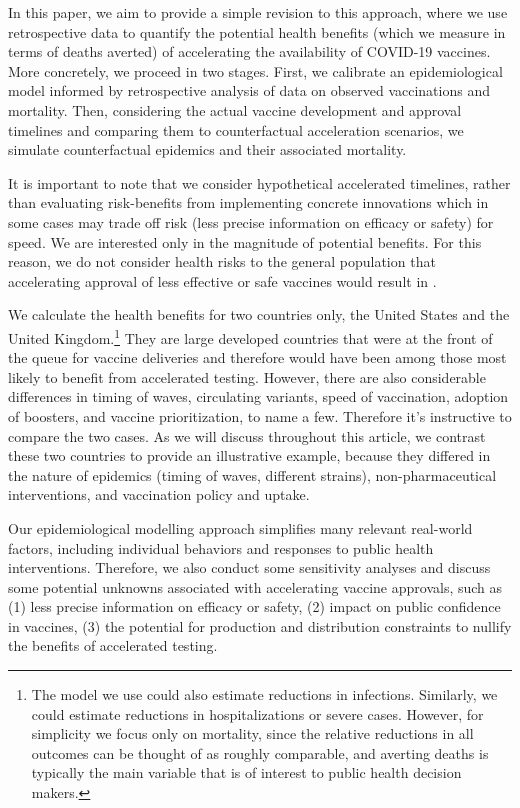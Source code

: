 \documentclass{article}
\begin{document}
In this paper, we aim to provide a simple revision to this approach, where we use retrospective data to quantify the potential health benefits (which we measure in terms of deaths averted) of accelerating the availability of COVID-19 vaccines. More concretely, we proceed in two stages. First, we calibrate an epidemiological model informed by retrospective analysis of data on observed vaccinations and mortality. Then, considering the actual vaccine development and approval timelines and comparing them to counterfactual acceleration scenarios, we simulate counterfactual epidemics and their associated mortality.

It is important to note that we consider hypothetical accelerated timelines, rather than evaluating risk-benefits from implementing concrete innovations which in some cases may trade off risk (less precise information on efficacy or safety) for speed. We are interested only in the magnitude of potential benefits. For this reason, we do not consider health risks to the general population that accelerating approval of less effective or safe vaccines would result in \citep{Chandra2022Regulatory}.

We calculate the health benefits for two countries only, the United States and the United Kingdom.\footnote{The model we use could also estimate reductions in infections. Similarly, we could estimate reductions in hospitalizations or severe cases. However, for simplicity we focus only on mortality, since the relative reductions in all outcomes can be thought of as roughly comparable, and averting deaths is typically the main variable that is of interest to public health decision makers.} They are large developed countries that were at the front of the queue for vaccine deliveries and therefore would have been among those most likely to benefit from accelerated testing. However, there are also considerable differences in timing of waves, circulating variants, speed of vaccination, adoption of boosters, and vaccine prioritization, to name a few. Therefore it's instructive to compare the two cases. As we will discuss throughout this article, we contrast these two countries to provide an illustrative example, because they differed in the nature of epidemics (timing of waves, different strains), non-pharmaceutical interventions, and vaccination policy and uptake.

Our epidemiological modelling approach simplifies many relevant real-world factors, including individual behaviors and responses to public health interventions. Therefore, we also conduct some sensitivity analyses and discuss some potential unknowns associated with accelerating vaccine approvals, such as (1) less precise information on efficacy or safety, (2) impact on public confidence in vaccines, (3) the potential for production and distribution constraints to nullify the benefits of accelerated testing.
\end{document}
